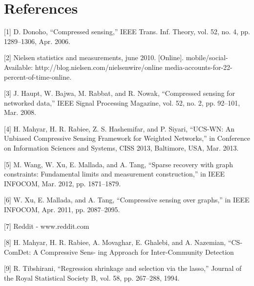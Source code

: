 \documentclass{article}
\begin{document}
\section*{References}
\small

[1] D. Donoho, “Compressed sensing,” IEEE Trans. Inf. Theory, vol. 52,
no. 4, pp. 1289–1306, Apr. 2006.

[2] Nielsen statistics and measurements, june 2010. [Online].
mobile/social-
Available: http://blog.nielsen.com/nielsenwire/online
media-accounts-for-22-percent-of-time-online.

[3] J. Haupt, W. Bajwa, M. Rabbat, and R. Nowak, “Compressed sensing
for networked data,” IEEE Signal Processing Magazine, vol. 52, no. 2,
    pp. 92–101, Mar. 2008.

[4] H. Mahyar, H. R. Rabiee, Z. S. Hashemifar, and P. Siyari, “UCS-WN: An
Unbiased Compressive Sensing Framework for Weighted Networks,” in
Conference on Information Sciences and Systems, CISS 2013, Baltimore,
USA, Mar. 2013.

[5] M. Wang, W. Xu, E. Mallada, and A. Tang, “Sparse recovery with graph
constraints: Fundamental limits and measurement construction,” in IEEE
INFOCOM, Mar. 2012, pp. 1871–1879.

[6] W. Xu, E. Mallada, and A. Tang, “Compressive sensing over graphs,”
in IEEE INFOCOM, Apr. 2011, pp. 2087–2095.

[7] Reddit - www.reddit.com

[8] H. Mahyar, H. R. Rabiee, A. Movaghar, E. Ghalebi,
and A. Nazemian, “CS-ComDet: A Compressive Sens-
ing Approach for Inter-Community Detection

[9] R. Tibshirani, “Regression shrinkage and selection via
the lasso,” Journal of the Royal Statistical Society B,
vol. 58, pp. 267–288, 1994.
\end{document}
